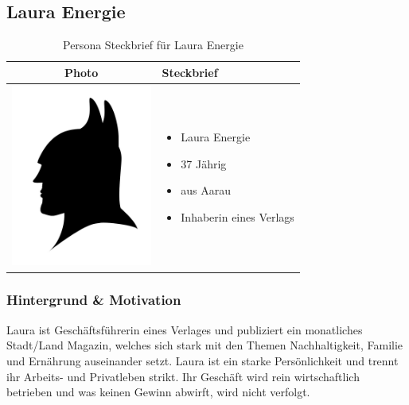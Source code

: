 \begin{description}
\subsection{Laura Energie}
\begin{table}[h!]
  \centering
  \begin{tabular}{ | c | m{5cm} | }
    \hline
    Photo & Steckbrief \\ \hline
    \begin{minipage}{.3\textwidth}
      \includegraphics[width=\linewidth, height=60mm]{images/batman.jpg}
    \end{minipage}
    &
      \begin{itemize}
        \item Laura Energie
        \item 37 Jährig
        \item aus Aarau
        \item Inhaberin eines Verlags
      \end{itemize}
    \\ \hline
  \end{tabular}
  \caption{Persona Steckbrief für Laura Energie}\label{tbl:steckbrieflaura}
\end{table}

\subsubsection{Hintergrund \& Motivation}
Laura ist Geschäftsführerin eines Verlages und publiziert ein monatliches Stadt/Land Magazin, welches sich stark mit den Themen Nachhaltigkeit, Familie und Ernährung auseinander setzt. Laura ist ein starke Persönlichkeit und trennt ihr Arbeits- und Privatleben strikt. Ihr Geschäft wird rein wirtschaftlich betrieben und was keinen Gewinn abwirft, wird nicht verfolgt.


\end{description}
